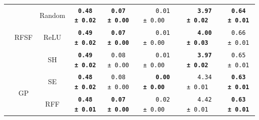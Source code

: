 {\begin{tabular}{c|cc|ccccc}
		& \multirow[t]{3}{*}{\acs{RFSF}} & Random         & \textbf{\texttt{~0.48\,±\,0.02}} & \textbf{\texttt{~0.07\,±\,0.00}} & \texttt{~~~~0.01\,±\,0.00~~}          & \textbf{\texttt{~~~3.97\,±\,0.02~~}} & \textbf{\texttt{~0.64\,±\,0.01}} \\
		&                                & \acs{ReLU}     & \textbf{\texttt{~0.49\,±\,0.02}} & \textbf{\texttt{~0.07\,±\,0.00}} & \texttt{~~~~0.01\,±\,0.00~~}          & \textbf{\texttt{~~~4.00\,±\,0.03~~}} & \texttt{~0.66\,±\,0.01}          \\
		&                                & \acs{SH}       & \textbf{\texttt{~0.49\,±\,0.02}} & \texttt{~0.08\,±\,0.00}          & \texttt{~~~~0.01\,±\,0.00~~}          & \textbf{\texttt{~~~3.97\,±\,0.02~~}} & \texttt{~0.65\,±\,0.01}          \\
		& \multirow[t]{2}{*}{\acs{GP}}   & \acs{SE}       & \textbf{\texttt{~0.48\,±\,0.02}} & \texttt{~0.08\,±\,0.00}          & \textbf{\texttt{~~~~0.00\,±\,0.00~~}} & \texttt{~~~4.34\,±\,0.01~~}          & \textbf{\texttt{~0.63\,±\,0.01}} \\
		&                                & \acs{RFF}      & \textbf{\texttt{~0.48\,±\,0.01}} & \textbf{\texttt{~0.07\,±\,0.00}} & \texttt{~~~~0.02\,±\,0.00~~}          & \texttt{~~~4.42\,±\,0.01~~}          & \textbf{\texttt{~0.63\,±\,0.01}} \\
		\bottomrule
	\end{tabular}
}
